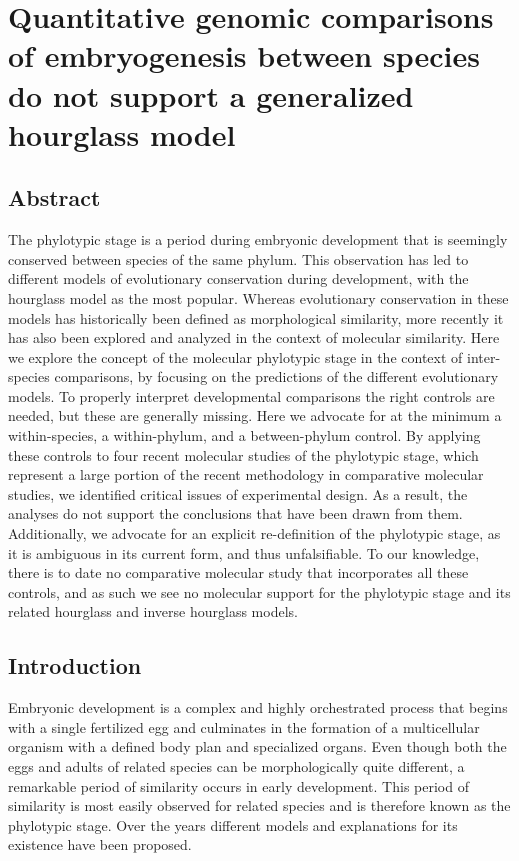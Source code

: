 \chapter{Quantitative genomic comparisons of embryogenesis between species do not support a generalized hourglass model}\thumbforchapter
{}
\newpage

\section{Abstract}

The phylotypic stage is a period during embryonic development that is seemingly conserved between species of the same phylum. This observation has led to different models of evolutionary conservation during development, with the hourglass model as the most popular. Whereas evolutionary conservation in these models has historically been defined as morphological similarity, more recently it has also been explored and analyzed in the context of molecular similarity. Here we explore the concept of the molecular phylotypic stage in the context of inter-species comparisons, by focusing on the predictions of the different evolutionary models. To properly interpret developmental comparisons the right controls are needed, but these are generally missing. Here we advocate for at the minimum a within-species, a within-phylum, and a between-phylum control. By applying these controls to four recent molecular studies of the phylotypic stage, which represent a large portion of the recent methodology in comparative molecular studies, we identified critical issues of experimental design. As a result, the analyses do not support the conclusions that have been drawn from them. Additionally, we advocate for an explicit re-definition of the phylotypic stage, as it is ambiguous in its current form, and thus unfalsifiable. To our knowledge, there is to date no comparative molecular study that incorporates all these controls, and as such we see no molecular support for the phylotypic stage and its related hourglass and inverse hourglass models.

\section{Introduction}

Embryonic development is a complex and highly orchestrated process that begins with a single fertilized egg and culminates in the formation of a multicellular organism with a defined body plan and specialized organs. Even though both the eggs and adults of related species can be morphologically quite different, a remarkable period of similarity occurs in early development. This period of similarity is most easily observed for related species and is therefore known as the phylotypic stage. Over the years different models and explanations for its existence have been proposed\cite{Kalinka2012,Irie2014,Drost2017}.

